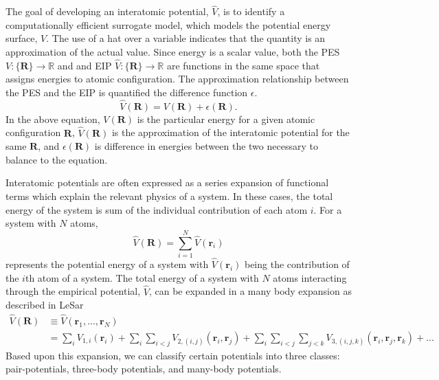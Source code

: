 The goal of developing an interatomic potential, $\hat{V}$, is to identify a computationally efficient surrogate model, which models the potential energy surface, $V$.  The use of a hat over a variable indicates that the quantity is an approximation of the actual value.
Since energy is a scalar value, both the PES ${V:\{\bm{R}\}\rightarrow \mathbb{R}}$ and and EIP ${\hat{V}:\{\bm{R}\} \rightarrow \mathbb{R}}$ are functions in the same space that assigns energies to atomic configuration.
The approximation relationship between the PES and the EIP is quantified the difference function $\epsilon$.
\begin{equation}
	\label{eq:pes_approximation}
    \hat{V}(\bm{R})
		=
		V(\bm{R}) + \epsilon(\bm{R}).
\end{equation}
In the above equation, $V(\bm{R})$ is the particular energy for a given atomic configuration $\bm{R}$, $\hat{V}(\bm{R})$ is the approximation of the interatomic potential for the same ${\bm{R}}$, and $\epsilon(\bm{R})$ is difference in energies between the two necessary to balance to the equation.

Interatomic potentials are often expressed as a series expansion of functional terms which explain the relevant physics of a system.  In these cases, the total energy of the system is sum of the individual contribution of each atom $i$.  For a system with $N$ atoms,
\begin{equation}
	\label{eq:potential_energy}
	\hat{V}(\bm{R})= \sum_{i=1}^{N} \hat{V}(\bm{r}_i)
\end{equation}
represents the potential energy of a system with $\hat{V}(\bm{r}_i)$ being the contribution of the $i$th atom of a system.
The total energy of a system with $N$ atoms interacting through the empirical potential, $\hat{V}$, can be expanded in a many body expansion as described in LeSar\cite{lesar2013_textbook}
\begin{align}
\label{eq:potential_expansion}
	\hat{V}(\bm{R}) &\equiv \hat{V}(\bm{r}_1,...,\bm{r}_N) \\
	          &= \sum_i V_{1,i} (\bm{r}_i)
	             + \sum_i \sum_{i<j} V_{2,(i,j)}(\bm{r}_i,\bm{r}_j)
		     + \sum_i \sum_{i<j} \sum_{j<k} V_{3,(i,j,k)}(\bm{r}_i,\bm{r}_j,\bm{r}_k)
		     + ...
\end{align}
Based upon this expansion, we can classify certain potentials into three classes: pair-potentials, three-body potentials, and many-body potentials.


